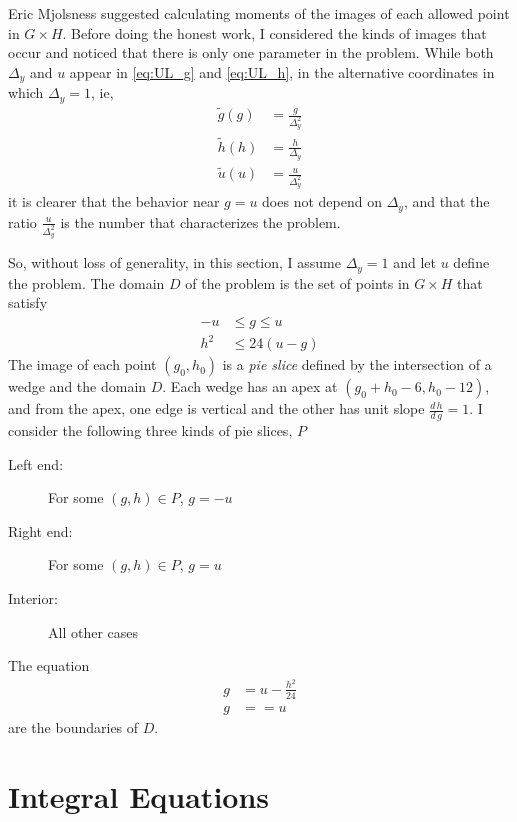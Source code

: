\documentclass[twocolumn]{article}
\begin{document}
Eric Mjolsness suggested calculating moments of the images of each
allowed point in $G \times H$.  Before doing the honest work, I
considered the kinds of images that occur and noticed that there is
only one parameter in the problem.  While both $\Delta_y$ and $u$
appear in \eqref{eq:UL_g} and \eqref{eq:UL_h}, in the alternative
coordinates in which $\Delta_y=1$, ie,
\begin{align*}
  \tilde g(g) &= \frac{g}{\Delta_y^2} \\
  \tilde h(h) &= \frac{h}{\Delta_y} \\
  \tilde u(u) &= \frac{u}{\Delta_y^2}
\end{align*}
it is clearer that the behavior near $g=u$ does not depend on
$\Delta_y$, and that the ratio $\frac{u}{\Delta_y^2}$ is the number
that characterizes the problem.

So, without loss of generality, in this section, I assume $\Delta_y=1$
and let $u$ define the problem.  The domain $D$ of the problem is the set
of points in $G\times H$ that satisfy
\begin{subequations}
  \label{eq:domain}
  \begin{align}
    -u &\leq g \leq u \\
    h^2 &\leq 24(u-g)
  \end{align}
\end{subequations}
The image of each point $(g_0, h_0)$ is a \emph{pie slice} defined by
the intersection of a wedge and the domain $D$.  Each wedge has an
apex at $(g_0+h_0-6, h_0-12)$, and from the apex, one edge is vertical
and the other has unit slope $\frac{d\, h}{d\, g} = 1$.  I consider
the following three kinds of pie slices, $P$
\begin{description}
\item[Left end:] For some $(g,h) \in P$, $g=-u$
\item[Right end:] For some $(g,h) \in P$, $g=u$
\item[Interior:] All other cases
\end{description}

The equation
\begin{subequations}
  \label{eq:boundary}
  \begin{align}
  g &= u -\frac{h^2}{24}\\
  g &= =u
  \end{align}
\end{subequations}
are the boundaries of $D$.
\section{Integral Equations}
\label{sec:integral-equations}
\end{document}
